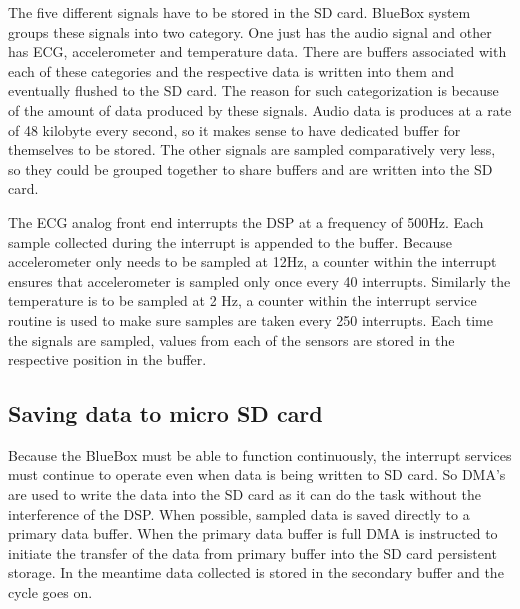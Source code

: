 The five different signals have to be stored in the SD card. BlueBox system groups these signals into two category. One just has the audio signal and other has ECG, accelerometer and temperature data. There are buffers associated with each of these categories and the respective data is written into them and eventually flushed to the SD card. The reason for such categorization is because of the amount of data produced by these signals. Audio data is produces at a rate of 48 kilobyte every second, so it makes sense to have dedicated buffer for themselves to be stored. The other signals are sampled comparatively very less, so they could be grouped together to share buffers and are written into the SD card. 

 The ECG analog front end interrupts the DSP at a frequency of 500Hz. Each sample collected during the interrupt is appended to the buffer. Because accelerometer only needs to be sampled at 12Hz, a counter within the interrupt ensures that accelerometer is sampled only once every 40 interrupts. Similarly the temperature is to be sampled at 2 Hz, a counter within the interrupt service routine is used to make sure samples are taken every 250 interrupts. Each time the signals are sampled, values from each of the sensors are stored in the respective position in the buffer. 
\subsection{Saving data to micro SD card}

Because the BlueBox must be able to function continuously, the interrupt services must continue to operate even when data is being written to SD card. So DMA's are used to write the data into the SD card as it can do the task without the interference of the DSP. When possible, sampled data is saved directly to a primary data buffer. When the primary data buffer is full DMA is instructed to initiate the transfer of the data from primary buffer into the SD card persistent storage. In the meantime data collected is stored in the secondary buffer and the cycle goes on. 

